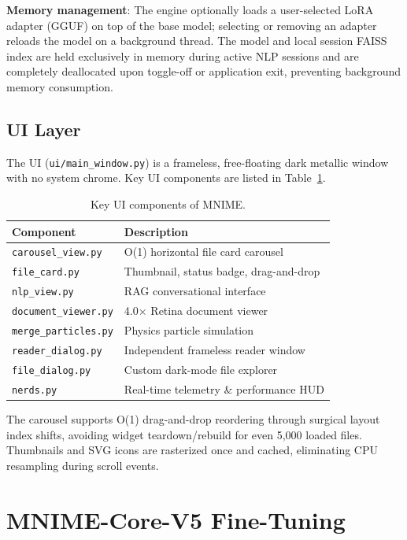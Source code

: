 \documentclass[11pt]{article}
\begin{document}
\textbf{Memory management}: The engine optionally loads a user-selected LoRA 
adapter (GGUF) on top of the base model; selecting or removing an adapter reloads the 
model on a background thread. The model and local session FAISS index 
are held exclusively in memory during active NLP sessions and are completely
deallocated upon toggle-off or application exit, preventing background
memory consumption.

\subsection{UI Layer}

The UI (\texttt{ui/main\_window.py}) is a frameless, free-floating dark
metallic window with no system chrome.
Key UI components are listed in Table~\ref{tab:ui_components}.

\begin{table}[h!]
\centering
\small
\begin{tabular}{@{}p{3.0cm}p{4.2cm}@{}}
\toprule
\textbf{Component} & \textbf{Description} \\
\midrule
\texttt{carousel\_view.py} & O(1) horizontal file card carousel \\
\texttt{file\_card.py} & Thumbnail, status badge, drag-and-drop \\
\texttt{nlp\_view.py} & RAG conversational interface \\
\texttt{document\_viewer.py} & 4.0$\times$ Retina document viewer \\
\texttt{merge\_particles.py} & Physics particle simulation \\
\texttt{reader\_dialog.py} & Independent frameless reader window \\
\texttt{file\_dialog.py} & Custom dark-mode file explorer \\
\texttt{nerds.py} & Real-time telemetry \& performance HUD \\
\bottomrule
\end{tabular}
\caption{Key UI components of MNIME.}
\label{tab:ui_components}
\end{table}

The carousel supports O(1) drag-and-drop reordering through surgical layout
index shifts, avoiding widget teardown/rebuild for even 5,000 loaded files.
Thumbnails and SVG icons are rasterized once and cached, eliminating CPU
resampling during scroll events.

\section{MNIME-Core-V5 Fine-Tuning}
\label{sec:model}
\end{document}

